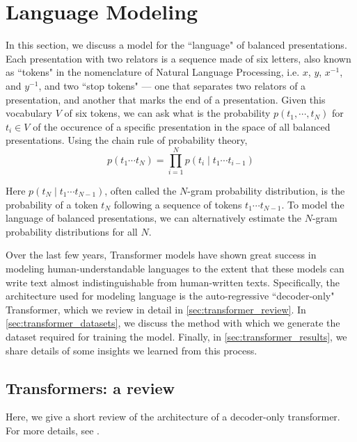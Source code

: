 
\section{Language Modeling} \label{sec:lm}

In this section, we discuss a model for the ``language" of balanced presentations. Each presentation with two relators is a sequence made of six letters, also known as ``tokens" in the nomenclature of Natural Language Processing, i.e. $x$, $y$, $x^{-1}$, and $y^{-1}$, and two ``stop tokens" --- one that separates two relators of a presentation, and another that marks the end of a presentation. Given this vocabulary $V$ of six tokens, we can ask what is the probability $p(t_1, \cdots, t_N)$ for $t_i \in V$ of the occurence of a specific presentation in the space of all balanced presentations. Using the chain rule of probability theory, 
\[
p(t_1 \cdots t_{N}) = \prod\limits_{i=1}^{N} p (t_{i} \mid t_{1} \cdots t_{i-1}) 
\]

Here $p (t_{N} \mid t_{1} \cdots t_{N-1})$, often called the $N$-gram probability distribution, is the probability of a token $t_N$ following a sequence of tokens $t_{1} \cdots t_{N-1}$. To model the language of balanced presentations, we can alternatively estimate the $N$-gram probability distributions for all $N$. 
\newline 

Over the last few years, Transformer models have shown great success in modeling human-understandable languages to the extent that these models can write text almost indistinguishable from human-written texts. Specifically, the architecture used for modeling language is the auto-regressive ``decoder-only" Transformer, which we review in detail in \autoref{sec:transformer_review}. In \autoref{sec:transformer_datasets}, we discuss the method with which we generate the dataset required for training the model. Finally, in \autoref{sec:transformer_results}, we share details of some insights we learned from this process. 

\subsection{Transformers: a review\label{sec:transformer_review}}

Here, we give a short review of the architecture of a decoder-only transformer. For more details, see \cite{vaswani2023attention, elhage2021mathematical, douglas2023large}. 
\newline 

